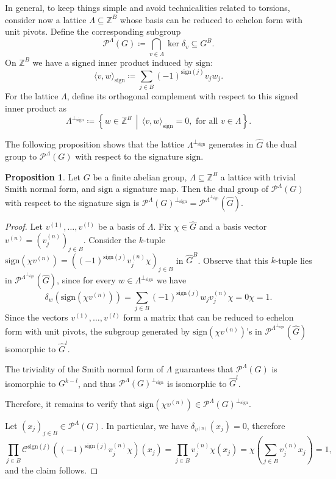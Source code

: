 \documentclass{amsart}
\theoremstyle{definition}
\newtheorem{proposition}[theorem]{Proposition}
\theoremstyle{remark}
\numberwithin{equation}{section}
\begin{document}
In general, to keep things simple and avoid technicalities related to  torsions, consider now a lattice  $\Lambda \subseteq \mathbb{Z}^B$ whose basis can be reduced to echelon form with unit pivots. 
Define the corresponding subgroup 
$$\mathcal{P}^{\Lambda}(G) \coloneqq  \bigcap_{v \in \Lambda} \ker \delta_v \subseteq G^B.$$
On $\mathbb{Z}^B$ we have a signed inner product induced by  $\mathrm{sign}$:
$$ \langle v, w \rangle_{\mathrm{sign}} \coloneqq \sum_{j \in B} (-1)^{\mathrm{sign}(j)} v_j w_j.$$
For the lattice $\Lambda$, define its orthogonal complement with respect to this signed inner product as 
$$ \Lambda^{\perp_{\mathrm{sign}}} \coloneqq \left\{ w \in \mathbb{Z}^B \, \middle| \,      \langle v, w \rangle_{\mathrm{sign}} = 0, \text{ for all } v \in \Lambda \right\}.$$

The following proposition shows that the lattice $\Lambda^{\perp_{\mathrm{sign}}}$ generates in $\widehat{G}$ the dual group to $\mathcal{P}^{\Lambda}(G)$ with respect to the signature $\mathrm{sign}$. 

\begin{proposition} Let $G$ be a finite abelian group, $\Lambda \subseteq \mathbb{Z}^B$  a lattice with trivial Smith normal form, and $\mathrm{sign}$ a signature map.
Then the dual group of $\mathcal{P}^{\Lambda}(G)$ with respect to the signature $\mathrm{sign}$ is $\mathcal{P}^\Lambda(G)^{\perp_{\mathrm{sign}}} =  \mathcal{P}^{\Lambda^{\perp_{\mathrm{sign}}}}(\widehat{G})$.
\end{proposition}
\begin{proof} Let $v^{(1)}, \dots, v^{(l)}$ be a basis of $\Lambda$. Fix $\chi \in \widehat{G}$ and a basis vector $v^{(n)}= \left(v^{(n)}_j\right)_{j \in B}$. Consider the $k$-tuple $\mathrm{sign}(\chi v^{(n)}) = \left((-1)^{\mathrm{sign}(j)}v^{(n)}_j \chi\right)_{j \in B}$ in ${\widehat{G}}^B$. Observe that this $k$-tuple lies in $\mathcal{P}^{\Lambda^{\perp_{\mathrm{sign}}}}(\widehat{G})$, since for every $w \in \Lambda^{\perp_{\mathrm{sign}}}$ we have 
$$\delta_w(\mathrm{sign}(\chi v^{(n)}))= \sum_{j \in B}(-1)^{\mathrm{sign}(j)}w_j v^{(n)}_j \chi = 0 \chi = 1.$$
Since the vectors $v^{(1)}, \dots, v^{(l)}$ form a matrix that  can be reduced to echelon form with unit pivots, the subgroup generated by   $\mathrm{sign}(\chi v^{(n)})$'s in $\mathcal{P}^{\Lambda^{\perp_{\mathrm{sign}}}}(\widehat{G})$ isomorphic to ${\widehat{G}}^l$. 

The triviality of the Smith normal form of $\Lambda$ guarantees that $\mathcal{P}^{\Lambda}(G)$ is isomorphic to $G^{k-l}$,  and thus $\mathcal{P}^{\Lambda}(G)^{\perp_{\mathrm{sign}}}$ is isomorphic to ${\widehat{G}}^l$.

Therefore, it remains to verify that   $\mathrm{sign}(\chi v^{(n)}) \in \mathcal{P}^{\Lambda}(G)^{\perp_{\mathrm{sign}}}$. 

\noindent
Let $(x_j)_{j\in B} \in \mathcal{P}^{\Lambda}(G)$. In particular, we have $\delta_{v^{(n)}}(x_j) = 0$, therefore
$$\prod_{j \in B}  \mathcal{C}^{\mathrm{sign}(j)} \left((-1)^{\mathrm{sign}(j)}v^{(n)}_j \chi\right)(x_j) = \prod_{j \in B}  v^{(n)}_j \chi( x_j) =    \chi\left(\sum_{j \in B}v^{(n)}_j x_j\right)  = 1,$$
and the claim follows.
\end{proof}
\end{document}

